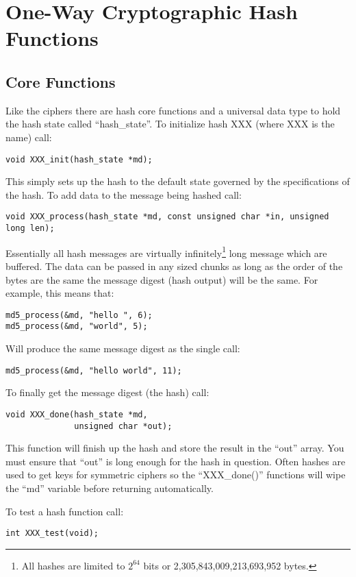 \documentclass{book}
\begin{document}
\chapter{One-Way Cryptographic Hash Functions}
\section{Core Functions}

Like the ciphers there are hash core functions and a universal data type to hold the hash state called ``hash\_state''.  
To initialize hash XXX (where XXX is the name) call:
\begin{verbatim}
void XXX_init(hash_state *md);
\end{verbatim}

This simply sets up the hash to the default state governed by the specifications of the hash.  To add data to the 
message being hashed call:
\begin{verbatim}
void XXX_process(hash_state *md, const unsigned char *in, unsigned long len);
\end{verbatim}

Essentially all hash messages are virtually infinitely\footnote{All hashes are limited to $2^{64}$ bits or 2,305,843,009,213,693,952 bytes.} long message which 
are buffered.  The data can be passed in any sized chunks as long as the order of the bytes are the same the message digest
(hash output) will be the same.  For example, this means that:
\begin{verbatim}
md5_process(&md, "hello ", 6);
md5_process(&md, "world", 5);
\end{verbatim}
Will produce the same message digest as the single call:
\begin{verbatim}
md5_process(&md, "hello world", 11);
\end{verbatim}

To finally get the message digest (the hash) call:
\begin{verbatim}
void XXX_done(hash_state *md, 
              unsigned char *out);
\end{verbatim}

This function will finish up the hash and store the result in the ``out'' array.  You must ensure that ``out'' is long
enough for the hash in question.  Often hashes are used to get keys for symmetric ciphers so the ``XXX\_done()'' functions
will wipe the ``md'' variable before returning automatically.

To test a hash function call:
\begin{verbatim}
int XXX_test(void);
\end{verbatim}
\end{document}
